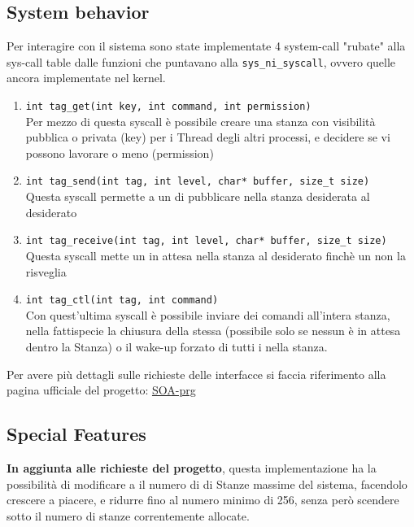 \subsection{System behavior}

Per interagire con il sistema sono state implementate 4 system-call "rubate" alla sys-call table dalle funzioni che
puntavano alla \verb|sys_ni_syscall|, ovvero quelle ancora implementate nel kernel.

\begin{enumerate}
    \item \verb|int tag_get(int key, int command, int permission)|\\
    Per mezzo di questa syscall è possibile creare una stanza con visibilità pubblica o privata (key) per i
    Thread degli altri processi, e decidere se vi possono lavorare o meno (permission)
    \item \verb|int tag_send(int tag, int level, char* buffer, size_t size)|\\
    Questa syscall permette a un \Writer di pubblicare nella stanza desiderata al \Topic desiderato
    \item \verb|int tag_receive(int tag, int level, char* buffer, size_t size)|\\
    Questa syscall mette un \Reader in attesa nella stanza al \Topic desiderato finchè un \Writer non la risveglia
    \item \verb|int tag_ctl(int tag, int command)|\\
    Con quest'ultima syscall è possibile inviare dei comandi all'intera stanza, nella fattispecie la chiusura della
    stessa (possibile solo se nessun \Reader è in attesa dentro la Stanza) o il wake-up forzato di tutti i \Reader
    nella stanza.
\end{enumerate}
Per avere più dettagli sulle richieste delle interfacce si faccia riferimento alla pagina ufficiale del progetto:
\href{https://francescoquaglia.github.io/TEACHING/AOS/PROJECTS/project-specification-2020-2021.html}{SOA-prg}

\subsection{Special Features} \label{specialFeature}
\textbf{In aggiunta alle richieste del progetto}, questa implementazione ha la possibilità di modificare a
\RunTime il numero di di Stanze massime del sistema, facendolo crescere a piacere, e ridurre fino al numero minimo di
256, senza però scendere sotto il numero di stanze correntemente allocate.



